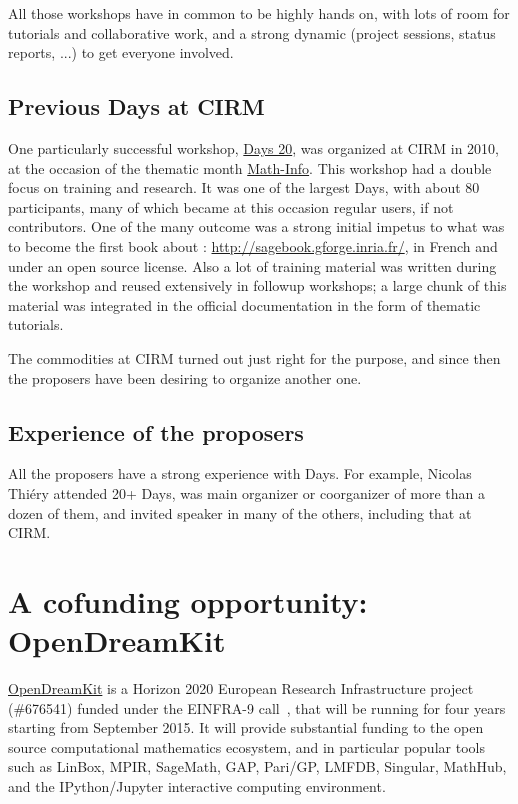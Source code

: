 \documentclass[12pt]{amsbook}
\begin{document}
All those workshops have in common to be highly hands on, with lots of
room for tutorials and collaborative work, and a strong dynamic
(project sessions, status reports, ...) to get everyone involved.

\subsection{Previous \Sage Days at CIRM}

One particularly successful workshop,
\href{https://www.lirmm.fr/arith/wiki/MathInfo2010/SageDays}{\Sage
  Days 20}, was organized at CIRM in 2010, at the occasion of the
thematic month
\href{https://www.lirmm.fr/arith/wiki/MathInfo2010/}{Math-Info}. This
workshop had a double focus on training and research. It was one of
the largest \Sage Days, with about 80 participants, many of which
became at this occasion regular \Sage users, if not contributors. One
of the many outcome was a strong initial impetus to what was to become
the first book about \Sage: \href{Calcul Mathématique avec
  Sage}{http://sagebook.gforge.inria.fr/}, in French and under an open
source license. Also a lot of training material was written during the
workshop and reused extensively in followup workshops; a large chunk
of this material was integrated in the \Sage official documentation in
the form of thematic tutorials.

The commodities at CIRM turned out just right for the purpose, and
since then the proposers have been desiring to organize another one.

\subsection{Experience of the proposers}

All the proposers have a strong experience with \Sage Days. For
example, Nicolas Thiéry attended 20+ \Sage Days, was main organizer or
coorganizer of more than a dozen of them, and invited speaker in many
of the others, including that at CIRM.

\section{A cofunding opportunity: OpenDreamKit}

\href{http://opendreamkit.org}{OpenDreamKit} is a Horizon 2020
European Research Infrastructure project (\#676541) funded under the
EINFRA-9 call~\cite{EINFRA-9}, that will be running for four years starting
from September 2015. It will provide substantial funding to the open
source computational mathematics ecosystem, and in particular popular
tools such as LinBox, MPIR, SageMath, GAP, Pari/GP, LMFDB, Singular,
MathHub, and the IPython/Jupyter interactive computing environment.
\end{document}

